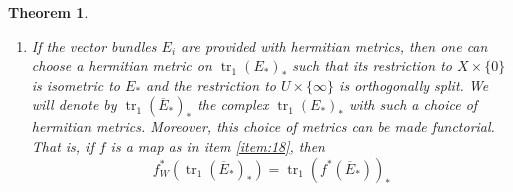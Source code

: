 \documentclass[10pt,twoside]{article}
\numberwithin{equation}{section}
\theoremstyle{plain}
\newtheorem{theorem}[equation]{Theorem}
\theoremstyle{definition}
\DeclareMathOperator{\tr}{tr}
\begin{document}
\begin{theorem}
\begin{enumerate}
\begin{enumerate}
    \item The map $f$ is arbitrary and $E_{\ast}$
      is acyclic. 
    \item \label{item:11}  $f$ is transverse to $Y$.
    \end{enumerate}
    Then $E'_{\ast}:=f^{\ast}(E_{\ast})$ is exact over $f^{-1}(U)$, 
    \begin{displaymath}
      W':=W(E'_{\ast})=W\underset{X}{\times}X',
    \end{displaymath}
    with $f_{W}\colon W'\longrightarrow W$ the induced map, 
    and we have
    $f_{W}^{\ast}(\tr_{1}(E_{\ast})_{\ast})=\tr_{1}(f^{\ast}(E_{\ast}))_{\ast}$.  
  \item \label{item:6} If the vector bundles $E_{i}$ are provided with
    hermitian 
    metrics, then one can choose a hermitian metric on
    $\tr_{1}(E_{\ast})_{\ast}$ such that its restriction to $X\times \{0\}$
    is 
    isometric to $E_{\ast}$ and the restriction to $U\times
    \{\infty\}$ is orthogonally split. We will denote by
    $\tr_{1}(\overline {E}_{\ast})_{\ast}$ the complex $\tr_{1}(E_{\ast})_{\ast}$
    with such a choice of hermitian metrics. 
    Moreover, this choice of metrics can be made functorial. That is, if $f$ is
    a map as in item \ref{item:18}, then 
    \begin{displaymath}
      f_{W}^{\ast}(\tr_{1}(\overline
      E_{\ast})_{\ast})=\tr_{1}(f^{\ast}(\overline E_{\ast}))_{\ast}
    \end{displaymath}
  \end{enumerate}
\end{theorem}
\end{document}
